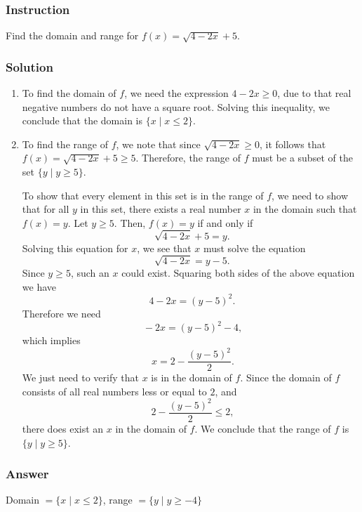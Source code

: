 \documentclass[letterpaper, oneside]{memoir}
\begin{document}
\subsubsection*{Instruction}

Find the domain and range for $ f(x) = \sqrt{4 - 2x} + 5 $.

\subsubsection*{Solution}

\begin{enumerate}[label=\roman*]
  \item To find the domain of $ f $, we need the expression $ 4 - 2x \ge 0 $, due to that real negative numbers do not have a square root. Solving this inequality, we conclude that the domain is $ \{ x \mid x \le 2 \} $.
  \item To find the range of $ f $, we note that since $ \sqrt{4 - 2x} \ge 0 $, it follows that $ f(x) = \sqrt{4 - 2x} + 5 \ge 5 $. Therefore, the range of $ f $ must be a subset of the set $ \{ y \mid y \ge 5 \} $.

    To show that every element in this set is in the range of $ f $, we need to show that for all $ y $ in this set, there exists a real number $ x $ in the domain such that $ f(x) = y $. Let $ y \ge 5 $. Then, $ f(x) = y $ if and only if
    $$ \phantom{.}
    \sqrt{4 - 2x} + 5 = y
    .$$
    Solving this equation for $ x $, we see that $ x $ must solve the equation
    $$ \phantom{.}
    \sqrt{4 - 2x}= y - 5
    .$$
    Since $ y \ge 5 $, such an $ x $ could exist. Squaring both sides of the above equation we have
    $$ \phantom{.}
    4-2x = (y - 5)^2
    .$$
    Therefore we need
    $$ \phantom{,}
    -2x= (y - 5)^2 - 4
    ,$$
    which implies
    $$ \phantom{,}
    x= 2 -\frac{(y - 5)^2}{2}
    .$$
    We just need to verify that $ x $ is in the domain of $ f $. Since the domain of $ f $ consists of all real numbers less or equal to $ 2 $, and
    $$ \phantom{,}
    2 -\frac{(y - 5)^2}{2} \le 2
    ,$$
    there does exist an $ x $ in the domain of $ f $. We conclude that the range of $ f $ is $ \{ y \mid y \ge 5 \} $.
\end{enumerate}

\subsubsection*{Answer}

Domain $ = \{ x \mid x \le 2 \} $, range $ = \{ y \mid y \ge -4 \} $
\end{document}
